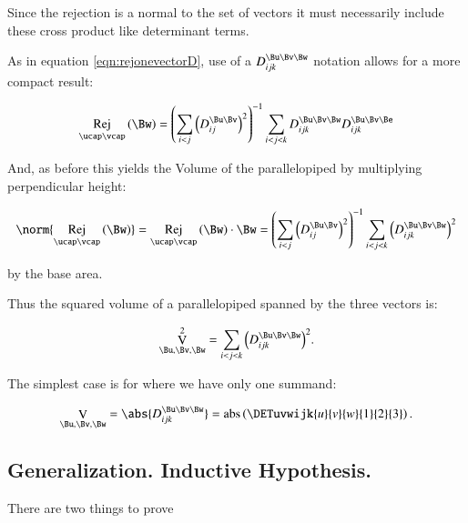 \documentclass{article}      %
\DeclareMathOperator{\AbsName}{abs}
\DeclareMathOperator{\RejName}{Rej}
\newcommand{\Rej}[2]{\RejName_{#1}\left( {#2} \right)}
\DeclareMathOperator{\VName}{V}
\newcommand{\VolumeOp}[1]{\VName_{#1}}
\begin{document}
Since the rejection is a normal to the set of vectors it must necessarily include these cross product like determinant terms.

As in equation \ref{eqn:rejonevectorD}, use of a $D_{ijk}^{\Bu\Bv\Bw}$ notation allows for a more compact
result:

\begin{equation}\label{eqn:rejtwovectorsD}
\Rej{\ucap\vcap}{\Bw} = 
{\left(\sum_{i<j} \left(D_{ij}^{\Bu\Bv}\right)^2\right)}^{-1}
\sum_{i<j<k} D_{ijk}^{\Bu\Bv\Bw} D_{ijk}^{\Bu\Bv\Be}
\end{equation}

And, as before this yields the Volume of the parallelopiped by multiplying perpendicular height:

\[
\norm{\Rej{\ucap\vcap}{\Bw}} =
\Rej{\ucap\vcap}{\Bw} \cdot \Bw =
{\left(\sum_{i<j} \left(D_{ij}^{\Bu\Bv}\right)^2\right)}^{-1}
\sum_{i<j<k} \left(D_{ijk}^{\Bu\Bv\Bw} \right)^2
\]

by the base area.

Thus the squared volume of a parallelopiped spanned by the three vectors is:

\begin{equation}\label{eqn:parallopipedvolume}
\VolumeOp{\Bu,\Bv,\Bw}^2 = \sum_{i<j<k} {\left(D_{ijk}^{\Bu \Bv \Bw}\right)}^2.
\end{equation}

The simplest case is for  where we have only one summand:

\begin{equation}\label{eqn:parallopipedvolumer3}
\VolumeOp{\Bu,\Bv,\Bw} 
= \abs{D_{ijk}^{\Bu \Bv \Bw}}
= \AbsName\left(
\DETuvwijk{u}{v}{w}{1}{2}{3}
\right).
\end{equation}

\subsection{ Generalization.  Inductive Hypothesis. }

There are two things to prove
\end{document}
